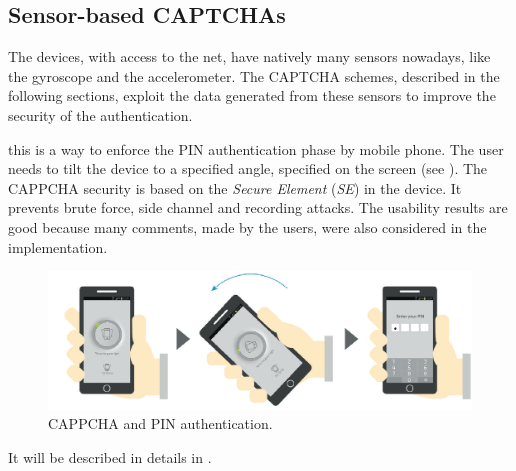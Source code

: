 \subsection{Sensor-based CAPTCHAs}
The devices, with access to the net, have natively many sensors nowadays, like the gyroscope and the accelerometer. The CAPTCHA schemes, described in the following sections, exploit the data generated from these sensors to improve the security of the authentication.
\begin{itemize}
{this is a way to enforce the PIN authentication phase by mobile phone\cite{CAPPCHA}. The user needs to tilt the device to a specified angle, specified on the screen (see ). The CAPPCHA security is based on the \textit{Secure Element} (\textit{SE}) in the device. It prevents brute force, side channel and recording attacks. The usability results are good because many comments, made by the users, were also considered in the implementation.
\begin{figure}[h]
     \centering
     \includegraphics[width=.8\linewidth]{Images/StateOfArt/CAPPCHA}
     \caption{\footnotesize{CAPPCHA and PIN authentication\cite{CAPPCHA}.}}\label{soa:CAPPCHA}
\end{figure}
}
{It will be described in details in .}
\end{itemize}

